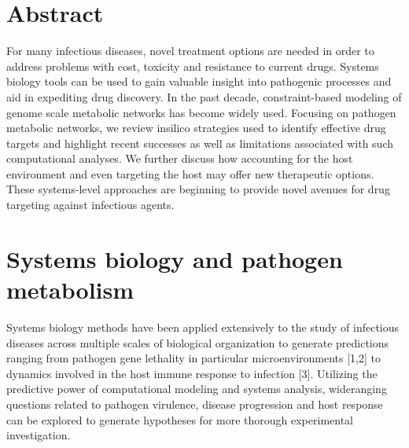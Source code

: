 \section{Abstract}
For many infectious diseases, novel treatment options are needed 
in order to address problems with cost, toxicity and resistance to 
current drugs. Systems biology tools can be used to gain valuable 
insight into pathogenic processes and aid in expediting drug discovery. 
In the past decade, constraint-based modeling of genome scale 
metabolic networks has become widely used. Focusing on pathogen 
metabolic networks, we review \gls{insilico} strategies used to identify 
effective drug targets and highlight recent successes as well as 
limitations associated with such computational analyses. We further 
discuss how accounting for the host environment and even targeting the 
host may offer new therapeutic options. These systems-level approaches 
are beginning to provide novel avenues for drug targeting against 
infectious agents.

\section{Systems biology and pathogen metabolism}
Systems biology methods have been applied extensively to the 
study of infectious diseases across multiple scales of 
biological organization to generate predictions ranging from pathogen 
gene lethality in particular microenvironments [1,2] to dynamics 
involved in the host immune response to infection [3]. Utilizing 
the predictive power of computational modeling and systems analysis, 
wideranging questions related to pathogen virulence, disease 
progression and host response can be explored to generate hypotheses 
for more thorough experimental investigation.

